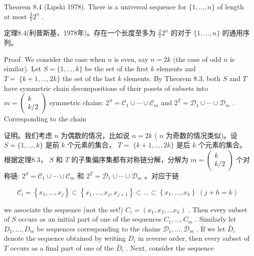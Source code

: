 \documentclass[10pt]{article}
\begin{document}
Theorem 8.4 (Lipski 1978). There is a universal sequence for \(\{ 1,\ldots ,n\}\) of length at most \(\frac{2}{\pi }{2}^{n}\) .

\begin{tcolorbox}\relax
定理8.4(利普斯基，1978年)。存在一个长度至多为 \(\frac{2}{\pi }{2}^{n}\) 的对于 \(\{ 1,\ldots ,n\}\) 的通用序列。
\end{tcolorbox}

Proof. We consider the case when \(n\) is even, say \(n = {2k}\) (the case of odd \(n\) is similar). Let \(S = \{ 1,\ldots ,k\}\) be the set of the first \(k\) elements and \(T = \; \{ k + 1,\ldots ,{2k}\}\) the set of the last \(k\) elements. By Theorem 8.3, both \(S\) and \(T\) have symmetric chain decompositions of their posets of subsets into \(m = \left( \begin{matrix} k \\  k/2 \end{matrix}\right)\) symmetric chains: \({2}^{S} = {\mathcal{C}}_{1} \cup  \cdots  \cup  {\mathcal{C}}_{m}\) and \({2}^{T} = {\mathcal{D}}_{1} \cup  \cdots  \cup  {\mathcal{D}}_{m}\) . Corresponding to the chain

\begin{tcolorbox}\relax
证明。我们考虑 \(n\) 为偶数的情况，比如说 \(n = {2k}\) ( \(n\) 为奇数的情况类似)。设 \(S = \{ 1,\ldots ,k\}\) 是前 \(k\) 个元素的集合， \(T = \; \{ k + 1,\ldots ,{2k}\}\) 是后 \(k\) 个元素的集合。根据定理8.3， \(S\) 和 \(T\) 的子集偏序集都有对称链分解，分解为 \(m = \left( \begin{matrix} k \\  k/2 \end{matrix}\right)\) 个对称链: \({2}^{S} = {\mathcal{C}}_{1} \cup  \cdots  \cup  {\mathcal{C}}_{m}\) 和 \({2}^{T} = {\mathcal{D}}_{1} \cup  \cdots  \cup  {\mathcal{D}}_{m}\) 。对应于链
\end{tcolorbox}

\[
{\mathcal{C}}_{i} = \left\{  {{x}_{1},\ldots ,{x}_{j}}\right\}   \subset  \left\{  {{x}_{1},\ldots ,{x}_{j},{x}_{j + 1}}\right\}   \subset  \ldots  \subset  \left\{  {{x}_{1},\ldots ,{x}_{h}}\right\}  \;\left( {j + h = k}\right)
\]

we associate the sequence (not the set!) \({C}_{i} = \left( {{x}_{1},{x}_{2},\ldots {x}_{h}}\right)\) . Then every subset of \(S\) occurs as an initial part of one of the sequences \({C}_{1},\ldots ,{C}_{m}\) . Similarly let \({D}_{1},\ldots ,{D}_{m}\) be sequences corresponding to the chains \({\mathcal{D}}_{1},\ldots ,{\mathcal{D}}_{m}\) . If we let \({\bar{D}}_{i}\) denote the sequence obtained by writing \({D}_{i}\) in reverse order, then every subset of \(T\) occurs as a final part of one of the \({\bar{D}}_{i}\) . Next, consider the sequence
\end{document}
